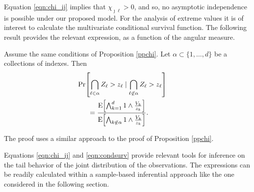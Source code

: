 Equation \ref{eqn:chi_ij} implies that $\chi_{\jmath\ell}>0$, and so, no asymptotic independence is possible 
  under our proposed model. For the analysis of extreme values it is of interest to calculate the multivariate 
  conditional survival function. The following result provides the relevant expression, as a function of the 
  angular measure.
  \begin{prop}
  Assume the same conditions of Proposition \ref{ppchi}.   Let $\alpha \subset \{1, \ldots ,d\}$ be a 
  collections of indexes.  Then     
  \begin{equation} \label{eqn:condsurv}
    \begin{aligned}
    &\hspace{-0.5cm}\mathrm{Pr}\left[\bigcap_{\ell \in \alpha} 
        Z_\ell > z_\ell \mid \bigcap_{\ell\not\in\alpha} Z_\ell > z_\ell\right] \\
    &= \frac{\expect{\bigwedge_{k = 1}^d 1\wedge \frac{V_k}{z_k}}}{\expect{\bigwedge_{k \not\in\alpha}1\wedge\frac{V_k}{z_k}}}.
    \end{aligned}
  \end{equation}
  \end{prop}  
  The proof uses a similar approach to the proof of Proposition \ref{ppchi}.

Equations \ref{eqn:chi_ij} and \ref{eqn:condsurv} provide relevant tools for inference on the tail 
  behavior of the joint distribution of the observations. The expressions can be readily calculated 
  within a sample-based inferential approach like the one considered in the following section.

